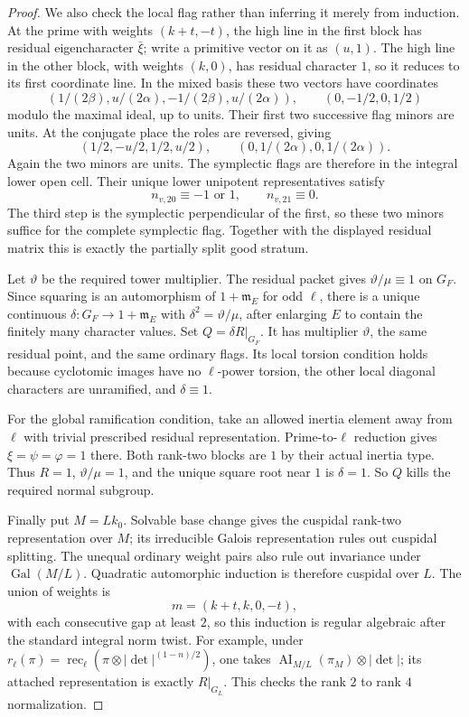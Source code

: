 \begin{proof}
We also check the local flag rather than inferring it merely
from induction.
At the prime with weights \((k+t,-t)\), the high line in
the first block has residual eigencharacter \(\bar\xi\);
write a primitive vector on it as \((u,1)\).
The high line in the other block, with weights \((k,0)\),
has residual character \(1\), so it reduces to its first
coordinate line.
In the mixed basis these two vectors have coordinates
\[
 (1/(2\beta),u/(2\alpha),-1/(2\beta),u/(2\alpha)),
 \qquad (0,-1/2,0,1/2)
\]
modulo the maximal ideal, up to units.
Their first two successive flag minors are units.
At the conjugate place the roles are reversed, giving
\[
 (1/2,-u/2,1/2,u/2),\qquad
 (0,1/(2\alpha),0,1/(2\alpha)).
\]
Again the two minors are units.
The symplectic flags are therefore in the integral lower open
cell. Their unique lower unipotent representatives satisfy
\[
 n_{v,20}\equiv-1\text{ or }1,\qquad n_{v,21}\equiv0.
\]
The third step is the symplectic perpendicular of the first,
so these two minors suffice for the complete symplectic flag.
Together with the displayed residual matrix this is exactly
the partially split good stratum.

Let \(\vartheta\) be the required tower multiplier.
The residual packet gives
\(\vartheta/\mu\equiv1\) on \(G_F\).
Since squaring is an automorphism of \(1+\mathfrak m_E\)
for odd \(\ell\), there is a unique continuous
\(\delta:G_F\to1+\mathfrak m_E\) with
\(\delta^2=\vartheta/\mu\), after enlarging \(E\) to contain
the finitely many character values.
Set \(Q=\delta R|_{G_F}\).
It has multiplier \(\vartheta\), the same residual point,
and the same ordinary flags.
Its local torsion condition holds because cyclotomic images
have no \(\ell\)-power torsion, the other local diagonal
characters are unramified, and \(\delta\equiv1\).

For the global ramification condition, take an allowed inertia
element away from \(\ell\) with trivial prescribed residual
representation. Prime-to-\(\ell\) reduction gives
\(\xi=\psi=\varphi=1\) there.
Both rank-two blocks are \(1\) by their actual inertia type.
Thus \(R=1\), \(\vartheta/\mu=1\), and the unique square root
near \(1\) is \(\delta=1\).
So \(Q\) kills the required normal subgroup.

Finally put \(M=Lk_0\).
Solvable base change gives the cuspidal rank-two representation
over \(M\); its irreducible Galois representation rules out
cuspidal splitting.
The unequal ordinary weight pairs also rule out invariance
under \(\operatorname{Gal}(M/L)\).
Quadratic automorphic induction is therefore cuspidal over \(L\).
The union of weights is
\[
 m=(k+t,k,0,-t),
\]
with each consecutive gap at least \(2\), so this induction
is regular algebraic after the standard integral norm twist.
For example, under
\(r_\ell(\pi)=\operatorname{rec}_\ell
(\pi\otimes|\det|^{(1-n)/2})\),
one takes
\(\operatorname{AI}_{M/L}(\pi_M)\otimes|\det|\);
its attached representation is exactly \(R|_{G_L}\).
This checks the rank \(2\) to rank \(4\) normalization.


\end{proof}
